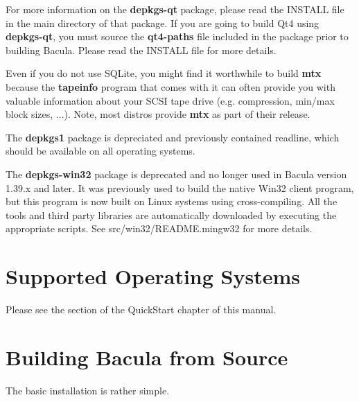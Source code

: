 For more information on the {\bf depkgs-qt} package, please read the
INSTALL file in the main directory of that package. If you are going to 
build Qt4 using {\bf depkgs-qt}, you must source the {\bf qt4-paths} file
included in the package prior to building Bacula. Please read the INSTALL
file for more details.

Even if you do not use SQLite, you might find it worthwhile to build {\bf mtx}
because the {\bf tapeinfo} program that comes with it can often provide you
with valuable information about your SCSI tape drive (e.g. compression,
min/max block sizes, ...). Note, most distros provide {\bf mtx} as part of 
their release.

The {\bf depkgs1} package is depreciated and previously contained
readline, which should be available on all operating systems.

The {\bf depkgs-win32} package is deprecated and no longer used in 
Bacula version 1.39.x and later. It was previously used to build
the native Win32 client program, but this program is now built on Linux
systems using cross-compiling.  All the tools and third party libraries
are automatically downloaded by executing the appropriate scripts.  See
src/win32/README.mingw32 for more details.

\section{Supported Operating Systems}
\label{Systems}

Please see the 
 section
of the QuickStart chapter of this manual. 

\section{Building Bacula from Source}
\label{Building}

The basic installation is rather simple. 

